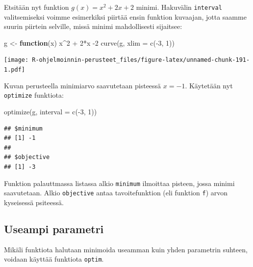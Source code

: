 \documentclass[
]{book}
\newenvironment{Shaded}{\begin{snugshade}}{\end{snugshade}}
\newcommand{\AttributeTok}[1]{\textcolor[rgb]{0.77,0.63,0.00}{#1}}
\newcommand{\ControlFlowTok}[1]{\textcolor[rgb]{0.13,0.29,0.53}{\textbf{#1}}}
\newcommand{\DecValTok}[1]{\textcolor[rgb]{0.00,0.00,0.81}{#1}}
\newcommand{\FunctionTok}[1]{\textcolor[rgb]{0.00,0.00,0.00}{#1}}
\newcommand{\NormalTok}[1]{#1}
\newcommand{\OtherTok}[1]{\textcolor[rgb]{0.56,0.35,0.01}{#1}}
\newcommand{\SpecialCharTok}[1]{\textcolor[rgb]{0.00,0.00,0.00}{#1}}
\begin{document}
Etsitään nyt funktion \(g(x) = x^2 + 2x + 2\) minimi. Hakuvälin \texttt{interval} valitsemiseksi voimme esimerkiksi piirtää ensin funktion kuvaajan, jotta saamme suurin piirtein selville, missä minimi mahdollisesti sijaitsee:

\begin{Shaded}
\begin{Highlighting}[]
\NormalTok{g }\OtherTok{\textless{}{-}} \ControlFlowTok{function}\NormalTok{(x) x}\SpecialCharTok{\^{}}\DecValTok{2} \SpecialCharTok{+} \DecValTok{2}\SpecialCharTok{*}\NormalTok{x }\SpecialCharTok{{-}}\DecValTok{2}
\FunctionTok{curve}\NormalTok{(g, }\AttributeTok{xlim =} \FunctionTok{c}\NormalTok{(}\SpecialCharTok{{-}}\DecValTok{3}\NormalTok{, }\DecValTok{1}\NormalTok{))}
\end{Highlighting}
\end{Shaded}

\texttt{[image: R-ohjelmoinnin-perusteet\_files/figure-latex/unnamed-chunk-191-1.pdf]}

Kuvan perusteella minimiarvo saavutetaan pisteessä \(x = -1\). Käytetään nyt \texttt{optimize} funktiota:

\begin{Shaded}
\begin{Highlighting}[]
\FunctionTok{optimize}\NormalTok{(g, }\AttributeTok{interval =} \FunctionTok{c}\NormalTok{(}\SpecialCharTok{{-}}\DecValTok{3}\NormalTok{, }\DecValTok{1}\NormalTok{))}
\end{Highlighting}
\end{Shaded}

\begin{verbatim}
## $minimum
## [1] -1
## 
## $objective
## [1] -3
\end{verbatim}

Funktion palauttmassa listassa alkio \texttt{minimum} ilmoittaa pisteen, jossa minimi saavutetaan. Alkio \texttt{objective} antaa tavoitefunktion (eli funktion \texttt{f}) arvon kyseisessä psiteessä.

\hypertarget{useampi-parametri}{%
\subsection{Useampi parametri}\label{useampi-parametri}}

Mikäli funktiota halutaan minimoida useamman kuin yhden parametrin suhteen, voidaan käyttää funktiota \texttt{optim}.
\end{document}
